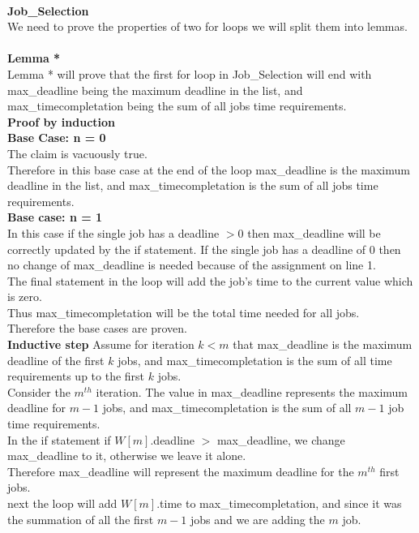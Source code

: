 \documentclass{article}
\begin{document}
        \\
        \textbf{Job\_Selection}\\
        We need to prove the properties of two for loops we will split them into lemmas.\\
        \\
        \textbf{Lemma *}\\
        Lemma * will prove that the first for loop in Job\_Selection will end with max\_deadline being the maximum deadline in the list, and max\_timecompletation being the sum of all jobs time requirements.\\
        \textbf{Proof by induction}\\
        \textbf{Base Case: n = 0}\\
        The claim is vacuously true.\\
        Therefore in this base case at the end of the loop max\_deadline is the maximum deadline in the list, and max\_timecompletation is the sum of all jobs time requirements.\\
        \textbf{Base case: n = 1}\\
        In this case if the single job has a deadline $> 0$ then max\_deadline will be correctly updated by the if statement. If the single job has a deadline of $0$ then no change of max\_deadline is needed because of the assignment on line 1.\\
        The final statement in the loop will add the job's time to the current value which is zero.\\
        Thus max\_timecompletation will be the total time needed for all jobs.\\
        Therefore the base cases are proven.\\
        \textbf{Inductive step} Assume for iteration $k < m$ that max\_deadline is the maximum deadline of the first $k$ jobs, and max\_timecompletation is the sum of all time requirements up to the first $k$ jobs.\\
        Consider the $m^{th}$ iteration. The value in max\_deadline represents the maximum deadline for $m - 1$ jobs, and max\_timecompletation is the sum of all $m - 1$ job time requirements.\\
        In the if statement if $W[m]$.deadline $>$ max\_deadline, we change max\_deadline to it, otherwise we leave it alone.\\
        Therefore max\_deadline will represent the maximum deadline for the $m^{th}$ first jobs.\\
        next the loop will add $W[m]$.time to max\_timecompletation, and since it was the summation of all the first $m - 1$ jobs and we are adding the $m$ job.\\
\end{document}
